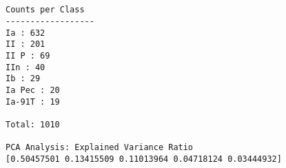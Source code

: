 \documentclass[11pt]{article}
\begin{document}
    \begin{center}
    \end{center}
    { \hspace*{\fill} \\}
    
    \begin{Verbatim}[commandchars=\\\{\}]

Counts per Class
------------------ 
Ia : 632
II : 201
II P : 69
IIn : 40
Ib : 29
Ia Pec : 20
Ia-91T : 19

Total: 1010

PCA Analysis: Explained Variance Ratio
[0.50457501 0.13415509 0.11013964 0.04718124 0.03444932]

    \end{Verbatim}

    \begin{center}
    \end{center}
    { \hspace*{\fill} \\}
    
    \begin{center}
    \end{center}
    { \hspace*{\fill} \\}
    
\end{document}
